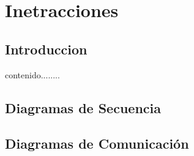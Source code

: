 \chapter{Inetracciones}
\section{Introduccion}
contenido........
\newpage

\section{Diagramas de Secuencia}
\newpage

\section{Diagramas de Comunicación}
\newpage

